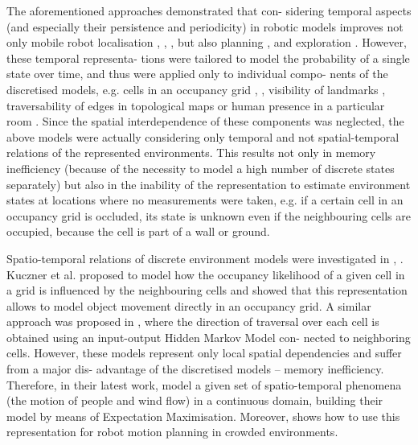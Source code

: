  The  aforementioned  approaches  demonstrated  that  con- sidering  temporal  aspects  (and  especially  their  persistence and periodicity) in robotic models improves not only mobile robot  localisation  \cite{krajnik2017fremen},  \cite{tipaldi2013lifelong},  \cite{biber2009experimental},  but  also  planning  \cite{fentanes2015now},  \cite{krajnik2015s} and  exploration  \cite{santos2016lifelong}.
  However,  these  temporal  representa- tions were tailored to model the probability of a single state over time, and thus were applied only to individual compo- nents  of  the  discretised  models,  e.g. cells  in  an  occupancy grid  \cite{tipaldi2013lifelong},  \cite{santos2016lifelong},  visibility  of  landmarks  \cite{krajnik2017fremen},  traversability  of edges  in  topological  maps  \cite{fentanes2015now}  or  human  presence  in  a particular  room  \cite{krajnik2015s}.
  Since  the  spatial  interdependence  of these  components  was  neglected,  the  above  models  were actually considering only temporal and not spatial-temporal relations  of  the  represented  environments.
  This  results  not only  in  memory  inefficiency  (because  of  the  necessity  to model  a  high  number  of discrete  states  separately)  but  also in the inability of the representation to estimate environment states  at  locations  where  no  measurements  were  taken,  e.g. if  a  certain  cell  in  an  occupancy  grid  is  occluded,  its  state is  unknown  even  if  the  neighbouring  cells  are  occupied, because the cell is part of a wall or ground.

 Spatio-temporal relations of discrete environment models were investigated in \cite{santos2016lifelong}, \cite{wang2014modeling}.
 Kuczner et al. \cite{santos2016lifelong} proposed to model how the occupancy likelihood of a given cell in a grid is influenced by the neighbouring cells and showed that this representation allows to model object movement directly in  an  occupancy  grid.
  A  similar  approach  was  proposed in  \cite{wang2014modeling},  where  the  direction  of  traversal  over  each  cell  is obtained using an input-output Hidden Markov Model con- nected to neighboring cells.
 However, these models represent only local spatial dependencies and suffer from a major dis- advantage  of the  discretised  models –  memory  inefficiency.
 Therefore,  in  their  latest  work,  \cite{kucner2017enabling}  model  a  given  set  of spatio-temporal phenomena (the motion of people and wind flow) in a continuous domain, building their model by means of Expectation Maximisation.
 Moreover, \cite{palmieri2017kinodynamic} shows how to use this representation for robot motion planning in crowded environments.


